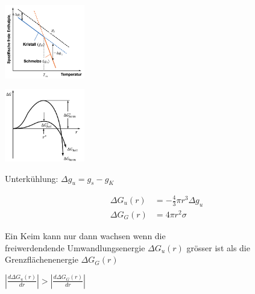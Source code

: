 \begin{tiny}
\begin{minipage}{0.5\linewidth}
    \includegraphics[width = 35mm]{src/images/Thermo_Erstarrung.png}

\end{minipage}
\begin{minipage}{0.5\linewidth}
    \includegraphics[width = 35mm]{src/images/Embryo_vs_Keim.png}

\end{minipage}

\begin{minipage}{0.5\linewidth}
    Unterkühlung: 
    $ \Delta g_u = g_s - g_K$\\
\end{minipage}
\begin{minipage}{0.5\linewidth}

    
    \begin{center}
        \begin{align*}
            \Delta G_u(r) &= - \frac{4}{3}\pi r^3\Delta g_u\\
            \Delta G_G(r) &= 4\pi r^2 \sigma
        \end{align*}
    \end{center}
\end{minipage}
\vspace{2mm}


\begin{minipage}{0.55\linewidth}
    Ein Keim kann nur dann wachsen wenn die \\
    freiwerdendende Umwandlungsenergie $\Delta G_u(r)$ grösser ist als die Grenzflächenenergie $\Delta G_G(r)$
\end{minipage}
\begin{minipage}{0.45\linewidth}
    \begin{center}
        $\left| \frac{d \Delta G_u(r)}{dr} \right| > \left| \frac{d \Delta G_G(r)}{dr} \right|$\\  
    \end{center}
\end{minipage}
\vspace{1mm}
\end{tiny}


